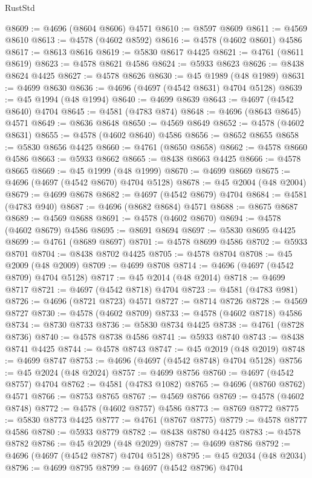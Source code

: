 \begin{lexlean}{RustStd}
\begin{coremodule}
@8609 := @4696 (@8604 @8606) @4571
@8610 := @8597 @8609
@8611 := @4569 @8610
@8613 := @4578 (@4602 @8592)
@8616 := @4578 (@4602 @8601) @4586
@8617 := @8613 @8616
@8619 := @5830 @8617 @4425
@8621 := @4761 (@8611 @8619)
@8623 := @4578 @8621 @4586
@8624 := @5933 @8623
@8626 := @8438 @8624 @4425
@8627 := @4578 @8626
@8630 := @45 @1989 (@48 @1989)
@8631 := @4699 @8630
@8636 := @4696 (@4697 (@4542 @8631) @4704 @5128)
@8639 := @45 @1994 (@48 @1994)
@8640 := @4699 @8639
@8643 := @4697 (@4542 @8640) @4704
@8645 := @4581 (@4783 @874)
@8648 := @4696 (@8643 @8645) @4571
@8649 := @8636 @8648
@8650 := @4569 @8649
@8652 := @4578 (@4602 @8631)
@8655 := @4578 (@4602 @8640) @4586
@8656 := @8652 @8655
@8658 := @5830 @8656 @4425
@8660 := @4761 (@8650 @8658)
@8662 := @4578 @8660 @4586
@8663 := @5933 @8662
@8665 := @8438 @8663 @4425
@8666 := @4578 @8665
@8669 := @45 @1999 (@48 @1999)
@8670 := @4699 @8669
@8675 := @4696 (@4697 (@4542 @8670) @4704 @5128)
@8678 := @45 @2004 (@48 @2004)
@8679 := @4699 @8678
@8682 := @4697 (@4542 @8679) @4704
@8684 := @4581 (@4783 @940)
@8687 := @4696 (@8682 @8684) @4571
@8688 := @8675 @8687
@8689 := @4569 @8688
@8691 := @4578 (@4602 @8670)
@8694 := @4578 (@4602 @8679) @4586
@8695 := @8691 @8694
@8697 := @5830 @8695 @4425
@8699 := @4761 (@8689 @8697)
@8701 := @4578 @8699 @4586
@8702 := @5933 @8701
@8704 := @8438 @8702 @4425
@8705 := @4578 @8704
@8708 := @45 @2009 (@48 @2009)
@8709 := @4699 @8708
@8714 := @4696 (@4697 (@4542 @8709) @4704 @5128)
@8717 := @45 @2014 (@48 @2014)
@8718 := @4699 @8717
@8721 := @4697 (@4542 @8718) @4704
@8723 := @4581 (@4783 @981)
@8726 := @4696 (@8721 @8723) @4571
@8727 := @8714 @8726
@8728 := @4569 @8727
@8730 := @4578 (@4602 @8709)
@8733 := @4578 (@4602 @8718) @4586
@8734 := @8730 @8733
@8736 := @5830 @8734 @4425
@8738 := @4761 (@8728 @8736)
@8740 := @4578 @8738 @4586
@8741 := @5933 @8740
@8743 := @8438 @8741 @4425
@8744 := @4578 @8743
@8747 := @45 @2019 (@48 @2019)
@8748 := @4699 @8747
@8753 := @4696 (@4697 (@4542 @8748) @4704 @5128)
@8756 := @45 @2024 (@48 @2024)
@8757 := @4699 @8756
@8760 := @4697 (@4542 @8757) @4704
@8762 := @4581 (@4783 @1082)
@8765 := @4696 (@8760 @8762) @4571
@8766 := @8753 @8765
@8767 := @4569 @8766
@8769 := @4578 (@4602 @8748)
@8772 := @4578 (@4602 @8757) @4586
@8773 := @8769 @8772
@8775 := @5830 @8773 @4425
@8777 := @4761 (@8767 @8775)
@8779 := @4578 @8777 @4586
@8780 := @5933 @8779
@8782 := @8438 @8780 @4425
@8783 := @4578 @8782
@8786 := @45 @2029 (@48 @2029)
@8787 := @4699 @8786
@8792 := @4696 (@4697 (@4542 @8787) @4704 @5128)
@8795 := @45 @2034 (@48 @2034)
@8796 := @4699 @8795
@8799 := @4697 (@4542 @8796) @4704

\end{coremodule}
\end{lexlean}
